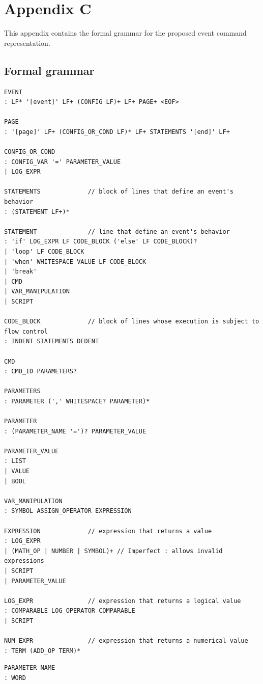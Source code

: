 \documentclass[11pt]{article}
\begin{document}
{\newpage
\section*{Appendix C}

This appendix contains the formal grammar for the proposed event command representation.

\subsection*{Formal grammar}

\begin{Verbatim}[frame=single, fontsize=\footnotesize]
EVENT
: LF* '[event]' LF+ (CONFIG LF)+ LF+ PAGE+ <EOF>

PAGE
: '[page]' LF+ (CONFIG_OR_COND LF)* LF+ STATEMENTS '[end]' LF+

CONFIG_OR_COND
: CONFIG_VAR '=' PARAMETER_VALUE
| LOG_EXPR

STATEMENTS             // block of lines that define an event's behavior
: (STATEMENT LF+)*

STATEMENT              // line that define an event's behavior
: 'if' LOG_EXPR LF CODE_BLOCK ('else' LF CODE_BLOCK)?
| 'loop' LF CODE_BLOCK
| 'when' WHITESPACE VALUE LF CODE_BLOCK
| 'break'
| CMD
| VAR_MANIPULATION
| SCRIPT

CODE_BLOCK             // block of lines whose execution is subject to flow control
: INDENT STATEMENTS DEDENT

CMD
: CMD_ID PARAMETERS?

PARAMETERS
: PARAMETER (',' WHITESPACE? PARAMETER)*

PARAMETER
: (PARAMETER_NAME '=')? PARAMETER_VALUE

PARAMETER_VALUE
: LIST
| VALUE
| BOOL

VAR_MANIPULATION
: SYMBOL ASSIGN_OPERATOR EXPRESSION

EXPRESSION             // expression that returns a value
: LOG_EXPR
| (MATH_OP | NUMBER | SYMBOL)+ // Imperfect : allows invalid expressions
| SCRIPT
| PARAMETER_VALUE

LOG_EXPR               // expression that returns a logical value
: COMPARABLE LOG_OPERATOR COMPARABLE
| SCRIPT

NUM_EXPR               // expression that returns a numerical value
: TERM (ADD_OP TERM)*
\end{Verbatim}


\newpage
\begin{Verbatim}[frame=single, fontsize=\footnotesize]
PARAMETER_NAME
: WORD


\end{Verbatim}}
\end{document}
